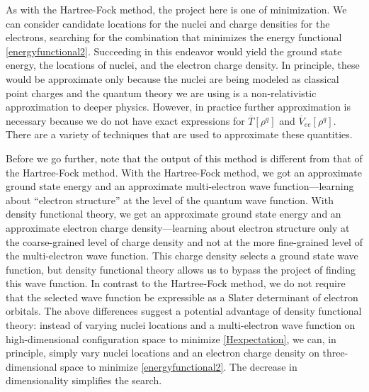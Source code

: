 \documentclass[onecolumn,secnumarabic,amsmath,amssymb,balancelastpage,nofootinbib]{article}
\begin{document}
As with the Hartree-Fock method, the project here is one of minimization.  We can consider candidate locations for the nuclei and charge densities for the electrons, searching for the combination that minimizes the energy functional \eqref{energyfunctional2}.  Succeeding in this endeavor would yield the ground state energy, the locations of nuclei, and the electron charge density.  In principle, these would be approximate only because the nuclei are being modeled as classical point charges and the quantum theory we are using is a non-relativistic approximation to deeper physics.  However, in practice further approximation is necessary because we do not have exact expressions for $\overline{T}[\rho^q]$ and $\overline{V}_{ee}[\rho^q]$.  There are a variety of techniques that are used to approximate these quantities.

Before we go further, note that the output of this method is different from that of the Hartree-Fock method.  With the Hartree-Fock method, we got an approximate ground state energy and an approximate multi-electron wave function---learning about ``electron structure'' at the level of the quantum wave function.  With density functional theory, we get an approximate ground state energy and an approximate electron charge density---learning about electron structure only at the coarse-grained level of charge density and not at the more fine-grained level of the multi-electron wave function.  This charge density selects a ground state wave function, but density functional theory allows us to bypass the project of finding this wave function.  In contrast to the Hartree-Fock method, we do not require that the selected wave function be expressible as a Slater determinant of electron orbitals.  The above differences suggest a potential advantage of density functional theory: instead of varying nuclei locations and a multi-electron wave function on high-dimensional configuration space to minimize \eqref{Hexpectation}, we can, in principle, simply vary nuclei locations and an electron charge density on three-dimensional space to minimize \eqref{energyfunctional2}.  The decrease in dimensionality simplifies the search.
\end{document}
